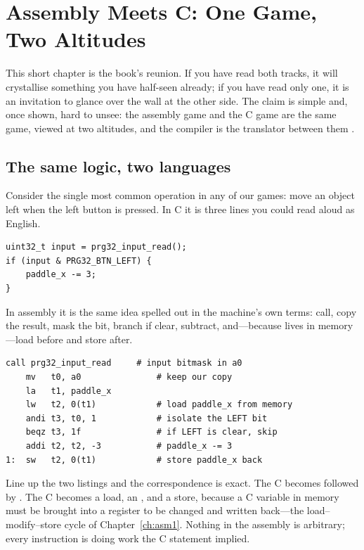 \chapter{Assembly Meets C: One Game, Two Altitudes}
\label{ch:join}

This short chapter is the book's reunion. If you have read both tracks, it will
crystallise something you have half-seen already; if you have read only one, it is
an invitation to glance over the wall at the other side. The claim is simple and,
once shown, hard to unsee: the assembly game and the C game are the same game,
viewed at two altitudes, and the compiler is the translator between them
\citep{prg32teaching}.

\section{The same logic, two languages}

Consider the single most common operation in any of our games: move an object left
when the left button is pressed. In C it is three lines you could read aloud as
English.

\begin{lstlisting}[style=c,caption={Move left, in C. Read input, test the bit, change the position.}]
uint32_t input = prg32_input_read();
if (input & PRG32_BTN_LEFT) {
    paddle_x -= 3;
}
\end{lstlisting}

In assembly it is the same idea spelled out in the machine's own terms: call,
copy the result, mask the bit, branch if clear, subtract, and---because
 lives in memory---load before and store after.

\begin{lstlisting}[style=asm,caption={Move left, in assembly. The same logic, with every step the C compiler would have generated made explicit.}]
    call prg32_input_read     # input bitmask in a0
    mv   t0, a0               # keep our copy
    la   t1, paddle_x
    lw   t2, 0(t1)            # load paddle_x from memory
    andi t3, t0, 1            # isolate the LEFT bit
    beqz t3, 1f               # if LEFT is clear, skip
    addi t2, t2, -3           # paddle_x -= 3
1:  sw   t2, 0(t1)            # store paddle_x back
\end{lstlisting}

Line up the two listings and the correspondence is exact. The C  becomes  followed by . The C  becomes a load, an , and a store, because a C variable in memory
must be brought into a register to be changed and written back---the
load--modify--store cycle of Chapter~\ref{ch:asm1}. Nothing in the assembly is
arbitrary; every instruction is doing work the C statement implied.

